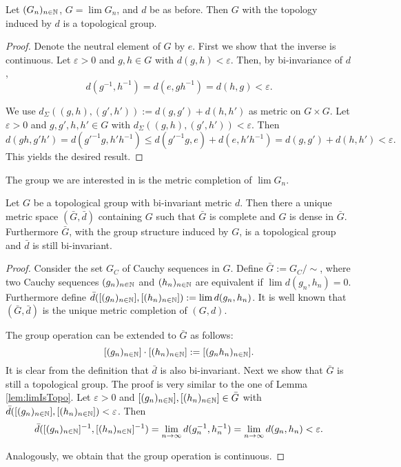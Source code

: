 \begin{lemma}\label{lem:limIsTopo}
Let $(G_n)_{n\in\mathbb{N}}$, $G=\lim G_n$, and $d$ be as before. Then $G$ with the topology induced by $d$ is a topological group.
\end{lemma}
\begin{proof}
Denote the neutral element of $G$ by $e$. First we show that the inverse is continuous. Let $\varepsilon>0$ and $g,h\in G$ with $d(g,h)<\varepsilon$. Then, by bi-invariance of $d$,
\[d(g^{-1},h^{-1})=d(e,gh^{-1})=d(h,g)<\varepsilon.\]

We use $d_\Sigma((g,h),(g',h')):=d(g,g')+d(h,h')$ as metric on $G\times G$. Let $\varepsilon>0$ and $g,g',h,h'\in G$ with $d_\Sigma((g,h),(g',h'))<\varepsilon$. Then
\[d(gh,g'h')=d(g'^{-1}g,h'h^{-1})\leq d(g'^{-1}g,e)+d(e,h'h^{-1})=d(g,g')+d(h,h')<\varepsilon.\]
This yields the desired result.
\end{proof}


The group we are interested in is the metric completion of $\lim G_n$. 
\begin{lemma}\label{lem:climIsTopo}
Let $G$ be a topological group with bi-invariant metric $d$. Then there a unique metric space $(\bar G,\bar d)$ containing $G$ such that $\bar G$ is complete and $G$ is dense in $\bar G$. Furthermore $\bar G$, with the group structure induced by $G$, is a topological group and $\bar d$ is still bi-invariant.
\end{lemma}
\begin{proof}
Consider the set $G_C$ of Cauchy sequences in $G$. Define $\bar G:=G_C/\sim$, where two Cauchy sequences $(g_n)_{n\in\mathbb{N}}$ and $(h_n)_{n\in\mathbb{N}}$ are equivalent if $\lim d(g_n,h_n)=0$. Furthermore define $\bar d([(g_n)_{n\in\mathbb{N}}],[(h_n)_{n\in\mathbb{N}}]):=\lim d(g_n,h_n)$. It is well known that $(\bar G,\bar d)$ is the unique metric completion of $(G,d)$.

The group operation can be extended to $\bar G$ as follows:
\[[(g_n)_{n\in\mathbb{N}}]\cdot[(h_n)_{n\in\mathbb{N}}]:=[(g_nh_n)_{n\in\mathbb{N}}].\]
It is clear from the definition that $\bar d$ is also bi-invariant. Next we show that $\bar G$ is still a topological group. 
The proof is very similar to the one of Lemma \ref{lem:limIsTopo}.
Let $\varepsilon>0$ and $[(g_n)_{n\in\mathbb{N}}],[(h_n)_{n\in\mathbb{N}}]\in\bar G$ with $\bar d([(g_n)_{n\in\mathbb{N}}],[(h_n)_{n\in\mathbb{N}}])<\varepsilon$. Then
\[\bar d([(g_n)_{n\in\mathbb{N}}]^{-1},[(h_n)_{n\in\mathbb{N}}]^{-1})=\lim_{n\to\infty} d(g_n^{-1},h_n^{-1})=\lim_{n\to\infty} d(g_n,h_n)<\varepsilon. \]

Analogously, we obtain that the group operation is continuous.
\end{proof}

